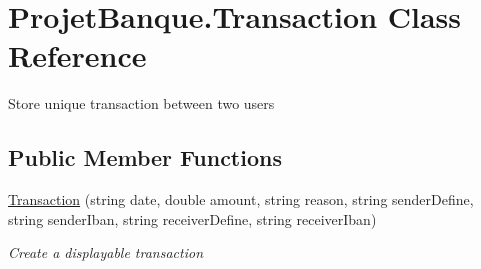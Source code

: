 \hypertarget{class_projet_banque_1_1_transaction}{}\section{Projet\+Banque.\+Transaction Class Reference}
\label{class_projet_banque_1_1_transaction}


Store unique transaction between two users  


\subsection*{Public Member Functions}
\begin{DoxyCompactItemize}
\item 
\mbox{\hyperlink{class_projet_banque_1_1_transaction_a8e5d39a1547162d6dcdf59aa5a65a2bf}{Transaction}} (string date, double amount, string reason, string sender\+Define, string sender\+Iban, string receiver\+Define, string receiver\+Iban)
\begin{DoxyCompactList}\small\item\em Create a displayable transaction \end{DoxyCompactList}\end{DoxyCompactItemize}
